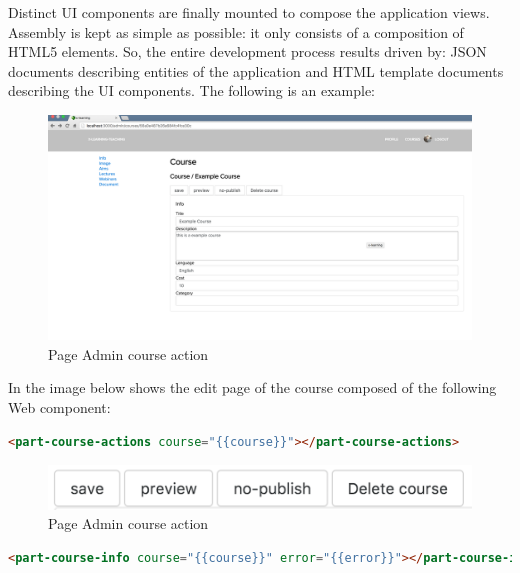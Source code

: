 Distinct UI components are finally mounted to compose the application views. Assembly is kept as simple as possible: it only consists of a composition of HTML5 elements. So, the entire development process results driven by: JSON documents describing entities of the application and HTML template documents describing the UI components.
{\color{red} The following is an example: }

\begin{figure}[htb] %
 \centering
 \includegraphics[width=1.0\linewidth]{images/chapter4/page-course-admin.png}\hfill
 \caption[Page Admin course action]{Page Admin course action}
 \label{fig:fourV}
\end{figure}

In the image below shows the edit page of the course composed of the following Web component:

\begin{lstlisting}[language=html]
<part-course-actions course="{{course}}"></part-course-actions>
\end{lstlisting}


\begin{figure}[htb] %
 \centering
 \includegraphics[width=1.0\linewidth]{images/chapter4/admin-course-actions.png}\hfill
 \caption[Page Admin course action]{Page Admin course action}
 \label{fig:fourV}
\end{figure}

\begin{lstlisting}[language=html]
<part-course-info course="{{course}}" error="{{error}}"></part-course-info>
\end{lstlisting}



